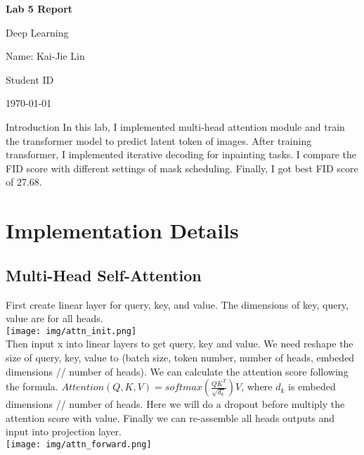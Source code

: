 \documentclass{article} %
\newcommand{\question}[2][]{\begin{flushleft}\textbf{Question #1}: \textit{#2}\end{flushleft}}
\newcommand{\maketitletwo}[2][]{\begin{center}
        \Large{\textbf{Lab 5 Report}
        
            Deep Learning} %
        \vspace{5pt}
        
        \normalsize{
            Name: Kai-Jie Lin 
            
            Student ID\: 110652019
            
            \today}
        \vspace{15pt}
        \end{center}}
\begin{document}
    \maketitletwo[5]  %

    \section{Introduction}
    In this lab, I implemented multi-head attention module and train the transformer model to predict latent token of images.
    After training transformer, I implemented iterative decoding for inpainting tasks.
    I compare the FID score with different settings of mask scheduling. Finally, I got best FID score of 27.68.
    
    \section{Implementation Details}
    \subsection{Multi-Head Self-Attention}
    First create linear layer for query, key, and value. The dimensions of key, query, value are for all heads.\\
    \texttt{[image: img/attn\_init.png]}\\
    Then input x into linear layers to get query, key and value. 
    We need reshape the size of query, key, value to  (batch size, token number, number of heads, embeded dimensions // number of heads).
    We can calculate the attention score following the formula. $Attention(Q,K,V)=softmax(\frac{QK^T}{\sqrt{d_k}})V$, where $d_k$ is embeded dimensions // number of heads.
    Here we will do a dropout before multiply the attention score with value.
    Finally we can re-assemble all heads outputs and input into projection layer.\\
    \texttt{[image: img/attn\_forward.png]}\\
\end{document}
